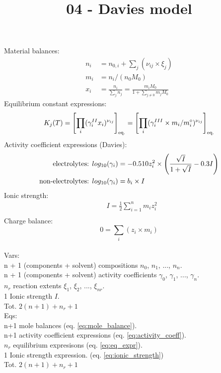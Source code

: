 \documentclass[onecolumn]{article}
\begin{document}
\title{04 - Davies model}
\author{}
\date{}
\maketitle
Material balances:
\begin{equation}
\begin{aligned}
\label{eq:mole_balance}
n_i &= n_{0,i} + \sum_j(\nu_{ij} \times \xi_j) \\
m_i &= n_i /(n_0 M_0) \\
x_i &= \frac{n_i}{\sum_j{n_j}}= \frac{m_i M_0}{1+\sum_{j\neq0}{m_j M_0}}
\end{aligned}
\end{equation}
Equilibrium constant expressions:
\begin{equation}
\label{eq:eq_expr}
K_j(T) = \left[ \prod_i(\gamma^{II}_i x_i)^{\nu_{ij}} \right]_{\textnormal{eq.}} =
\left[ \prod_i(\gamma^{III}_i \times m_i/m^{\circ}_i )^{\nu_{ij}} \right]_{\textnormal{eq.}}
\end{equation}
Activity coefficient expressions (Davies):
\begin{equation}
\label{eq:activity_coeff}
\begin{aligned}
\textnormal{electrolytes: } & log_{10}(\gamma_{i}) = -0.510 z_i^2 \times \left( \frac{\sqrt{I}}{1+\sqrt{I}} -0.3 I \right) \\
\textnormal{non-electrolytes: } & log_{10}(\gamma_{i}) = b_i \times I
\end{aligned}
\end{equation}
Ionic strength:
\begin{equation}
\label{eq:ionic_strength}
\begin{aligned}
& I = \frac{1}{2} \sum_{i=1}^n m_i z_i^2 \\
\end{aligned}
\end{equation}
Charge balance:
\begin{equation}
0 = \sum_i(z_i \times m_i)
\end{equation}
\\
Vars: \\
n + 1 (components + solvent) compositions $n_0$, $n_1$, ..., $n_n$. \\
n + 1 (components + solvent) activity coefficients
$\gamma_0$, $\gamma_1$, ..., $\gamma_n$. \\
$n_r$ reaction extents $\xi_1$, $\xi_2$, ..., $\xi_{nr}$. \\
1 Ionic strength $I$. \\
Tot. $2(n + 1) + n_r + 1$ \\
Eqs: \\
n+1 mole balances (eq. \ref{eq:mole_balance}). \\
n+1 activity coefficient expressions (eq. \ref{eq:activity_coeff}). \\
$n_r$ equilibrium expresisons (eq. \ref{eq:eq_expr}). \\
1 Ionic strength expression. (eq. \ref{eq:ionic_strength})\\
Tot. $2(n + 1) + n_r + 1$
\end{document}
